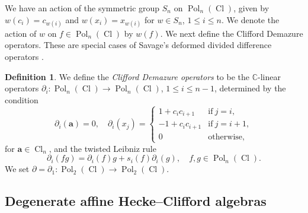 \documentclass[11pt]{amsart}
\theoremstyle{definition}
\newtheorem{defn}[theo]{Definition}
\numberwithin{equation}{section}
\begin{document}
We have an action of the symmetric group $ S_{n} $ on $ \operatorname{Pol}_{n}(\operatorname{Cl}) $, given by $ w(c_{i}) = c_{w(i)} $ and $ w(x_{i}) = x_{w(i)} $ for $ w \in S_{n} $, $ 1 \leq i \leq n $. We denote the action of \(w\) on $ f \in \operatorname{Pol}_{n}(\operatorname{Cl}) $ by $ w(f) $. We next define the Clifford Demazure operators. These are special cases of Savage's deformed divided difference operators \cite[§4.1]{Savage}.


\begin{defn} \label{Cliff_Demazure}
We define the \emph{Clifford Demazure operators} to be the $ \mathbb{C} $-linear operators $ \partial_{i} \colon \operatorname{Pol}_{n}(\operatorname{Cl}) \rightarrow \operatorname{Pol}_{n}(\operatorname{Cl}) $, $ 1 \leq i \leq n-1 $, determined by the condition
\begin{equation} \label{Cliff_leibniz33}
\partial_{i}(\mathbf{a}) = 0, \quad \partial_{i}(x_{j}) = 
\begin{cases}
1+c_{i}c_{i+1} &\text{if} \ j = i,
\\ -1+c_{i}c_{i+1}  &\text{if} \ j = i+1,
\\ 0 &\text{otherwise},
\end{cases}
\end{equation}
for $ \mathbf{a} \in \operatorname{Cl}_{n} $, and the twisted Leibniz rule
\begin{equation} \label{Cliff_leibniz}
\partial_{i}(fg) = \partial_{i}(f)g + s_{i}(f)\partial_{i}(g), \quad f,g \in \operatorname{Pol}_{n}(\operatorname{Cl}).
\end{equation}
We set $ \partial = \partial_{1} \colon \operatorname{Pol}_{2}(\operatorname{Cl}) \rightarrow \operatorname{Pol}_{2}(\operatorname{Cl}) $.
\end{defn}





\subsection{Degenerate affine Hecke--Clifford algebras} 
\end{document}
